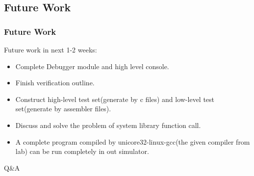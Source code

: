 \documentclass[CJK]{beamer}
\begin{document}
\begin{CJK}{UTF8}{gbsn}
\section{Future Work}

\begin{frame}
  \frametitle{Future Work}
  Future work in next 1-2 weeks:
  \begin{itemize}
    \item Complete Debugger module and high level console.
    \item Finish verification outline.
    \item Construct high-level test set(generate by c files) and low-level test set(generate by assembler files).
    \item Discuss and solve the problem of system library function call.
    \item A complete program compiled by unicore32-linux-gcc(the given compiler from lab) can be run completely in out simulator.
  \end{itemize}
\end{frame}

\begin{frame}
  Q\&A
\end{frame}


\end{CJK}
\end{document}
